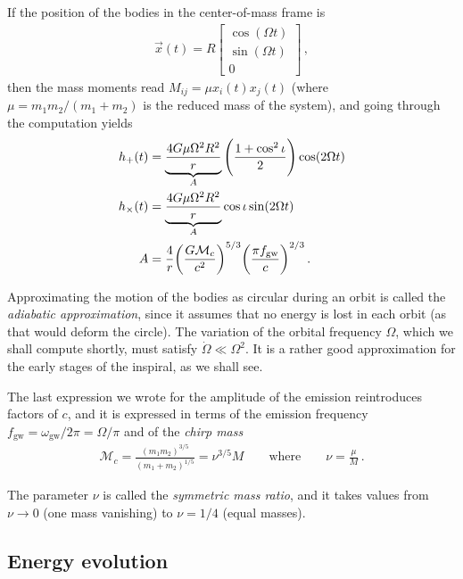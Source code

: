 \documentclass[main.tex]{subfiles}
\begin{document}
If the position of the bodies in the center-of-mass frame is 
%
\begin{align}
\vec{x}(t) = R \left[\begin{array}{c}
\cos(\Omega t) \\ 
\sin(\Omega t) \\ 
0
\end{array}\right]
\,,
\end{align}
%
then the mass moments read \(M_{ij} = \mu x_i (t) x_j(t)\) (where \(\mu = m_1 m_2 / (m_1 + m_2 ) \) is the reduced mass of the system), and going through the computation yields \cite[eq.\ 3.332]{maggioreGravitationalWavesVolume2007}
%
\begin{align} \label{eq:binary-waveform-1}
h_{+} (t) &= \underbrace{\frac{4 G \mu \Omega^2 R^2}{r}}_{A} \qty(\frac{1 + \cos^2 \iota }{2}) \cos( 2 \Omega t) 
\\
h_{ \times } (t) &= \underbrace{\frac{4 G \mu \Omega^2 R^2}{r}}_{A} \cos \iota  \sin( 2 \Omega t) 
\\
A &= \frac{4}{r} \qty(\frac{G\mathcal{M}_c}{c^2})^{5/3} \qty(\frac{\pi f _{\text{gw}}}{c})^{2/3} 
\,.
\end{align}

Approximating the motion of the bodies as circular during an orbit is called the \emph{adiabatic approximation}, since it assumes that no energy is lost in each orbit (as that would deform the circle). The variation of the orbital frequency \(\Omega \), which we shall compute shortly, must satisfy \(\dot{\Omega} \ll \Omega^2\). 
It is a rather good approximation for the early stages of the inspiral, as we shall see. 

The last expression we wrote for the amplitude of the emission reintroduces factors of \(c\), and it is expressed in terms of the emission frequency \(f _{\text{gw}} = \omega _{\text{gw}} / 2 \pi = \Omega / \pi \) and of the \emph{chirp mass}
%
\begin{align} \label{eq:chirp-mass}
\mathcal{M}_c = \frac{(m_1 m_2 )^{3/5}}{(m_1 + m_2 )^{1/5}} = \nu^{3/5} M 
\qquad \text{where} \qquad
\nu = \frac{\mu}{M}
\,.
\end{align}

The parameter \(\nu \) is called the \emph{symmetric mass ratio}, and it takes values from \(\nu \to 0\) (one mass vanishing) to \(\nu = 1/4\) (equal masses).

\subsection{Energy evolution}
\end{document}
